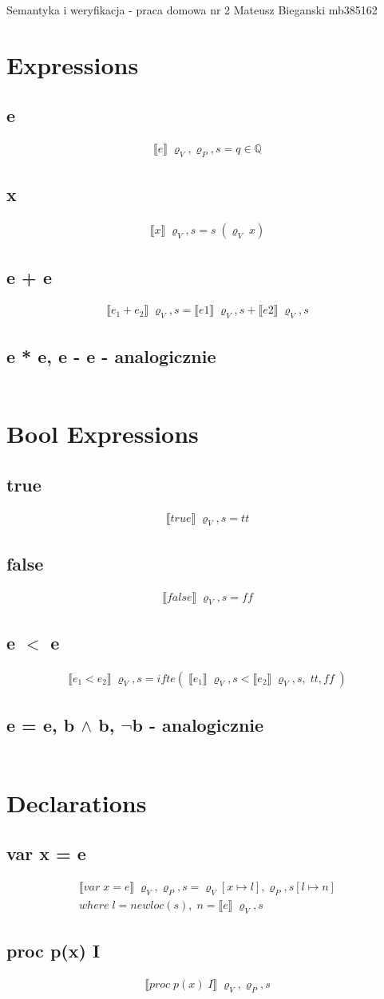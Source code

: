 \documentclass[12pt]{article}
\newcommand{\sem}[1]{\llbracket #1 \rrbracket}
\newcommand{\srod}{\;\varrho_{V}, s}
\newcommand{\srodP}{\;\varrho_{V}, \varrho_{P}, s}
\newcommand{\eq}[2]{\subsection{#1} \begin{gather*} #2 \end{gather*}}
\begin{document}
\begin{center}
	\Large{Semantyka i weryfikacja - praca domowa nr 2}
	\newline
	\large{Mateusz Bieganski mb385162}
\end{center}


\section{Expressions}
\eq{e}{	
	\sem{e} \srodP = q \in \mathbb{Q}
}

\eq {x} {
	\sem{x} \srod = s \;(\varrho_{V} \; x)
}

\eq {e + e} {
	\sem{e_1 + e_2} \srod = \sem{e1} \srod + \sem{e2} \srod
}

\eq {e * e, e - e - analogicznie} {
\;
}

\section{Bool Expressions}
\eq {true} {
	\sem{true} \srod = tt
}

\eq {false} {
	\sem{false} \srod = ff
}

\eq {e $<$ e} {
	\sem{e_1 < e_2} \srod = ifte(\;\sem{e_1} \srod < \sem{e_2} \srod, \; tt, ff \;)
}

\eq {e = e, b $\wedge$ b, $\neg$b - analogicznie} {
	\;
}

\section{Declarations}
\eq {var x = e} {
	\sem{var \; x = e} \srodP = \varrho_{V}[x \mapsto l], \varrho_{P}, s[l \mapsto n] \\
	where \; l = newloc(s), \; n = \sem{e} \srod
}

\eq {proc p(x) I} {
	\sem{proc \; p(x) \;I} \srodP
}
\end{document}
